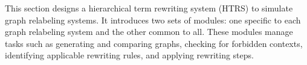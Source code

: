 

This section designs a hierarchical term rewriting system (HTRS) to simulate graph relabeling systems. It introduces two sets of modules: one specific to each graph relabeling system and the other common to all. These modules manage tasks such as generating and comparing graphs, checking for forbidden contexts, identifying applicable rewriting rules, and applying rewriting steps.

